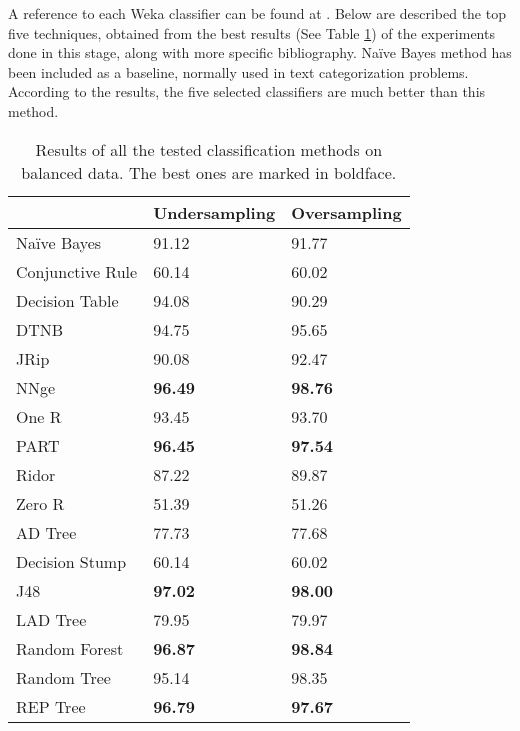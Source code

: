 \documentclass{llncs}
\begin{document}
A reference to each Weka classifier can be found at \cite{Frank2011}. Below are described the top five techniques, obtained from the best results (See Table \ref{tabresults_todos}) of the experiments done in this stage, along with more specific bibliography. Naïve Bayes method \cite{Bayesian_Classifier_97} has been included as a baseline, normally used in text categorization problems. According to the results, the five selected classifiers are much better than this method.

\begin{table}[htpb]
\centering
 \caption{\label{tabresults_todos} Results of all the tested classification methods on balanced data. The best ones are marked in boldface.}
{\small
\begin{tabular}{|l|l|l|}
\cline{2-3}
\multicolumn{1}{l|}{} & Undersampling & Oversampling \\ 
\hline
Naïve Bayes & 91.12 & 91.77 \\ 
\hline
Conjunctive Rule & 60.14 & 60.02 \\ 
\cline{1-1}
Decision Table & 94.08 & 90.29 \\ 
\cline{1-1}
DTNB & 94.75 & 95.65 \\ 
\cline{1-1}
JRip & 90.08 & 92.47 \\ 
\cline{1-1}
NNge & \textbf{96.49} & \textbf{98.76} \\ 
\cline{1-1}
One R & 93.45 & 93.70 \\ 
\cline{1-1}
PART & \textbf{96.45} & \textbf{97.54} \\ 
\cline{1-1}
Ridor & 87.22 & 89.87 \\ 
\cline{1-1}
Zero R & 51.39 & 51.26 \\ 
\cline{1-1}
AD Tree & 77.73 & 77.68 \\ 
\cline{1-1}
Decision Stump & 60.14 & 60.02 \\ 
\cline{1-1}
J48 & \textbf{97.02} & \textbf{98.00} \\ 
\cline{1-1}
LAD Tree & 79.95 & 79.97 \\ 
\cline{1-1}
Random Forest & \textbf{96.87} & \textbf{98.84} \\ 
\cline{1-1}
Random Tree & 95.14 & 98.35 \\ 
\cline{1-1}
REP Tree & \textbf{96.79} & \textbf{97.67} \\ 
\hline
\end{tabular}
}
\end{table}
\end{document}
